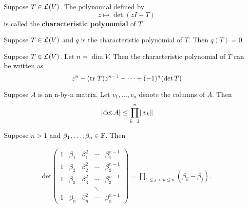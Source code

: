 \documentclass{extarticle}
\begin{document}
\begin{definition}
    Suppose \(T \in \mathcal{L}(V)\). The polynomial defined by 
    \[z \mapsto \det (zI - T)\]
    is called the \textbf{characteristic polynomial} of \(T\).
\end{definition}

\begin{thm}
    Suppose \(T \in \mathcal{L}(V)\) and \(q\) is the characteristic polynomial of \(T\). Then \(q(T) = 0\).
\end{thm}

\begin{corollary}
    Suppose \(T \in \mathcal{L}(V)\). Let \(n = \dim V\). Then the characteristic polynomial of \(T\) can be written 
    as 
    \[z^n - (\text{tr} \ T) z^{n-1} + \cdots  + (-1)^n (\det T)\]
\end{corollary}



\begin{thm}
    Suppose \(A\) is an n-by-n matrix. Let \(v_1, \ldots, v_n\) denote the columns of \(A\). Then 
    \[|\det A| \leq \prod_{k=1}^{n} \norm{v_k}\]
\end{thm}


\begin{thm}
    Suppose \(n > 1\) and \(\beta_1, \ldots, \beta_n \in \mathbb{F}\). Then 

    \begin{align*}
        \text{det} \begin{pmatrix}
            1 & \beta_1 & \beta_1^2 & \cdots & \beta_1^{n-1} \\
            1 & \beta_2 & \beta_2^2 & \cdots & \beta_2^{n-1} \\
            1 & \beta_3 & \beta_3^2 & \cdots & \beta_3^{n-1} \\
             &  &  & \ddots &  \\
            1 & \beta_n & \beta_n^2 & \cdots & \beta_n^{n-1}
            \end{pmatrix} = \prod_{1 \leq j < k \leq n} (\beta_k - \beta_j).
    \end{align*}
\end{thm}




\end{document}
